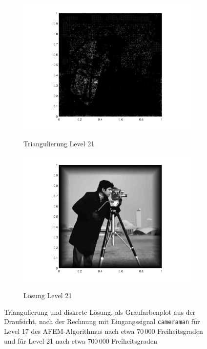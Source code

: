 \begin{figure}[p]
  \begin{subfigure}[b]{.39\linewidth}
    \centering
    \caption{Triangulierung Level 21}
    \includegraphics[trim = 100 30 80 20, clip, width=\linewidth]
      {pictures/chapExperiments/secGrayscale/cam/adaptive/lvl21/triangulation.png}
    \label{fig:camLvl21Triang}
  \end{subfigure}
  \quad
  \begin{subfigure}[b]{.39\linewidth}
    \centering
    \caption{Lösung Level 21}
    \includegraphics[trim = 100 30 80 20, clip, width=\linewidth]
      {pictures/chapExperiments/secGrayscale/cam/adaptive/lvl21/solutionGrayscale.png}
    \label{fig:camLvl21Sol}
  \end{subfigure}
  \caption{Triangulierung und diskrete Lösung, als Graufarbenplot aus der
    Draufsicht, nach der Rechnung mit Eingangssignal \texttt{cameraman} für
    Level 17 des AFEM-Algorithmus nach etwa 70\,000 Freiheitsgraden und für
    Level 21 nach etwa 700\,000 Freiheitsgraden}
  \label{fig:camTriang}
\end{figure}
